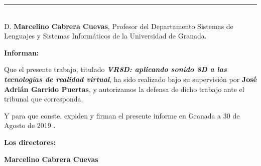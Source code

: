 \noindent\rule[-1ex]{\textwidth}{2pt}\\[4.5ex]

D. \textbf{Marcelino Cabrera Cuevas}, Profesor del Departamento Sistemas de Lenguajes y Sistemas Informáticos de la Universidad de Granada.

\vspace{0.5cm}

\textbf{Informan:}

\vspace{0.5cm}

Que el presente trabajo, titulado \textit{\textbf{VR8D: aplicando sonido 8D a las tecnologías de realidad virtual}},
ha sido realizado bajo su supervisión por \textbf{José Adrián Garrido Puertas}, y autorizamos la defensa de dicho trabajo ante el tribunal que corresponda.

\vspace{0.5cm}

Y para que conste, expiden y firman el presente informe en Granada a 30 de Agosto de 2019 .

\vspace{1cm}

\textbf{Los directores:}

\vspace{5cm}

\noindent \textbf{Marcelino Cabrera Cuevas}

\newpage %
